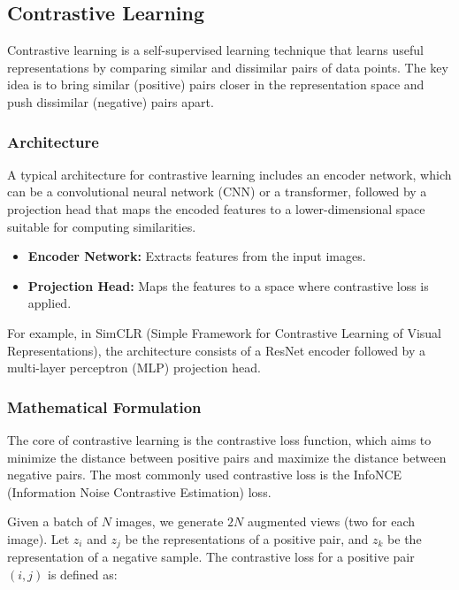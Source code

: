 \documentclass[12pt]{article}
\begin{document}
\subsection{Contrastive Learning}

Contrastive learning is a self-supervised learning technique that learns useful representations by comparing similar and dissimilar pairs of data points. The key idea is to bring similar (positive) pairs closer in the representation space and push dissimilar (negative) pairs apart.

\subsubsection{Architecture}

A typical architecture for contrastive learning includes an encoder network, which can be a convolutional neural network (CNN) or a transformer, followed by a projection head that maps the encoded features to a lower-dimensional space suitable for computing similarities.

\begin{itemize}
    \item \textbf{Encoder Network:} Extracts features from the input images.
    \item \textbf{Projection Head:} Maps the features to a space where contrastive loss is applied.
\end{itemize}

For example, in SimCLR (Simple Framework for Contrastive Learning of Visual Representations), the architecture consists of a ResNet encoder followed by a multi-layer perceptron (MLP) projection head.

\subsubsection{Mathematical Formulation}

The core of contrastive learning is the contrastive loss function, which aims to minimize the distance between positive pairs and maximize the distance between negative pairs. The most commonly used contrastive loss is the InfoNCE (Information Noise Contrastive Estimation) loss.

Given a batch of $N$ images, we generate $2N$ augmented views (two for each image). Let $z_i$ and $z_j$ be the representations of a positive pair, and $z_k$ be the representation of a negative sample. The contrastive loss for a positive pair $(i, j)$ is defined as:
\end{document}
